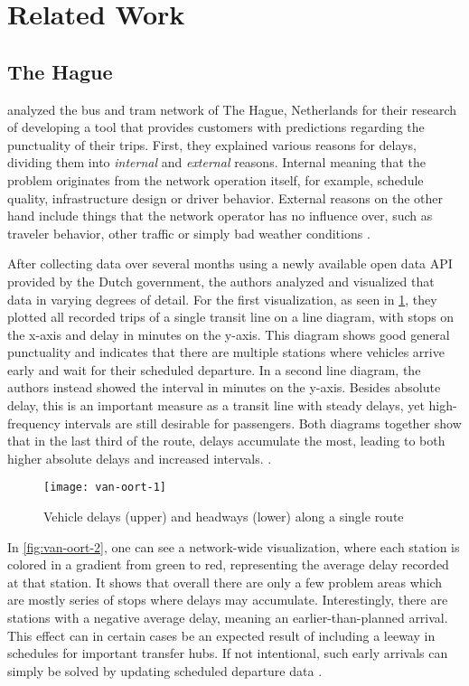 \section{Related Work}
\label{section:related-work}

\subsection{The Hague}
\textcite{van-oort-2015} analyzed the bus and tram network of The Hague, Netherlands for their research of developing a tool that provides customers with predictions regarding the punctuality of their trips. First, they explained various reasons for delays, dividing them into \textit{internal} and \textit{external} reasons. Internal meaning that the problem originates from the network operation itself, for example, schedule quality, infrastructure design or driver behavior. External reasons on the other hand include things that the network operator has no influence over, such as traveler behavior, other traffic or simply bad weather conditions \autocite[372--374]{van-oort-2015}.

After collecting data over several months using a newly available open data \ac{API} provided by the Dutch government, the authors analyzed and visualized that data in varying degrees of detail. For the first visualization, as seen in \cref{fig:van-oort-1}, they plotted all recorded trips of a single transit line on a line diagram, with stops on the x-axis and delay in minutes on the y-axis. This diagram shows good general punctuality and indicates that there are multiple stations where vehicles arrive early and wait for their scheduled departure. In a second line diagram, the authors instead showed the interval in minutes on the y-axis. Besides absolute delay, this is an important measure as a transit line with steady delays, yet high-frequency intervals are still desirable for passengers. Both diagrams together show that in the last third of the route, delays accumulate the most, leading to both higher absolute delays and increased intervals. \autocite[378]{van-oort-2015}.

\begin{figure}[h]
	\centering
	\texttt{[image: van-oort-1]}
	\caption{Vehicle delays (upper) and headways (lower) along a single route \autocite[378]{van-oort-2015}}
	\label{fig:van-oort-1}
\end{figure}

In \cref{fig:van-oort-2}, one can see a network-wide visualization, where each station is colored in a gradient from green to red, representing the average delay recorded at that station. It shows that overall there are only a few problem areas which are mostly series of stops where delays may accumulate. Interestingly, there are stations with a negative average delay, meaning an earlier-than-planned arrival. This effect can in certain cases be an expected result of including a leeway in schedules for important transfer hubs. If not intentional, such early arrivals can simply be solved by updating scheduled departure data \autocite[379--380]{van-oort-2015}.

